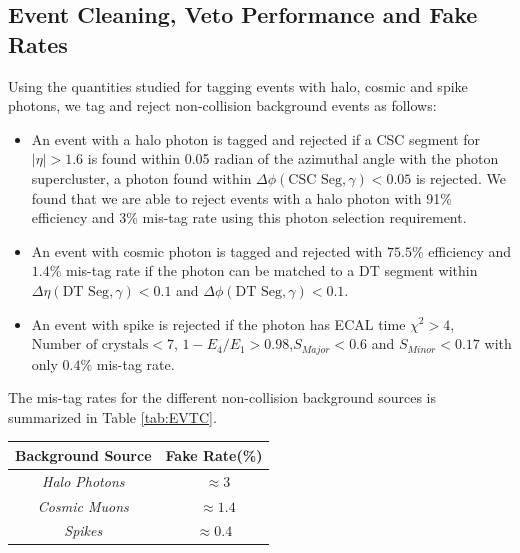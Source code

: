 \subsection{Event Cleaning, Veto Performance and Fake Rates}
Using the quantities studied for tagging events with halo, cosmic and spike photons, we tag and reject non-collision background  events as follows: 
\begin{itemize}
\item An event with a halo photon is tagged and rejected if a CSC segment for $|\eta| > 1.6$ is found within 0.05 radian of the azimuthal angle with the photon supercluster, \ie a photon found within $\Delta\phi(\mbox{CSC Seg},\gamma) < 0.05$ is rejected. We found that we are able to reject events with a  halo photon with 91\% efficiency and 3\% mis-tag rate using this photon selection requirement.
\item An event with cosmic photon is tagged and rejected with $75.5$\% efficiency and $1.4$\% mis-tag rate if the photon can be matched to a DT segment within $\Delta\eta(\mbox{DT Seg},\gamma) < 0.1$ and $\Delta\phi(\mbox{DT Seg},\gamma) < 0.1$.
\item An event with spike is rejected if the photon has ECAL time $\chi^{2} > 4$, $\mbox{Number of crystals} < 7$, $ 1-E_{4}/E_{1} > 0.98$,$S_{Major} < 0.6$ and $S_{Minor} < 0.17$ with only $0.4$\% mis-tag rate.
\end{itemize}
The mis-tag rates for the different non-collision background sources is summarized in Table \ref{tab:EVTC}.

\begin{minipage}{0.90\linewidth} 
\begin{center}
\begin{tabular}{|c| c|}
\hline
\bfseries{Background Source} & \bfseries {Fake Rate}(\%)\\
\hline\hline
\textit{Halo Photons} & ~$\approx 3$ \\
\textit{Cosmic Muons} & ~$\approx 1.4$ \\
\textit{Spikes} & $\approx 0.4$ \\
\hline
\end{tabular}
\label{tab:EVTC} 
\end{center}
\end{minipage}

